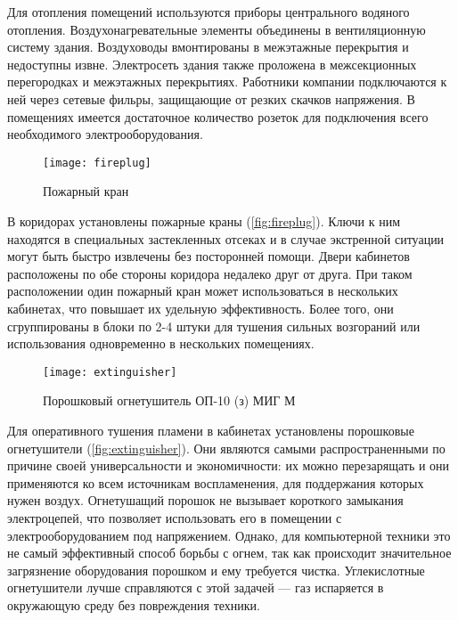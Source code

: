 Для отопления помещений используются приборы центрального водяного отопления. Воздухонагревательные элементы объединены в вентиляционную систему здания. Воздуховоды вмонтированы в межэтажные перекрытия и недоступны извне. Электросеть здания также проложена в межсекционных перегородках и межэтажных перекрытиях. Работники компании подключаются к ней через сетевые фильры, защищающие от резких скачков напряжения. В помещениях имеется достаточное количество розеток для подключения всего необходимого электрооборудования.

\begin{figure}
  \begin{center}
    \texttt{[image: fireplug]}
    \caption{Пожарный кран}
    \label{fig:fireplug}
  \end{center}
\end{figure}

В коридорах установлены пожарные краны (\autoref{fig:fireplug}). Ключи к ним находятся в специальных застекленных отсеках и в случае экстренной ситуации могут быть быстро извлечены без посторонней помощи. Двери кабинетов расположены по обе стороны коридора недалеко друг от друга. При таком расположении один пожарный кран может использоваться в нескольких кабинетах, что повышает их удельную эффективность. Более того, они сгруппированы в блоки по 2-4 штуки для тушения сильных возгораний или использования одновременно в нескольких помещениях.

\begin{figure}
  \begin{center}
    \texttt{[image: extinguisher]}
    \caption{Порошковый огнетушитель \mbox{ОП-10} (з) МИГ М}
    \label{fig:extinguisher}
  \end{center}
\end{figure}

Для оперативного тушения пламени в кабинетах установлены порошковые огнетушители (\autoref{fig:extinguisher}). Они являются самыми распространенными по причине своей универсальности и экономичности: их можно перезарящать и они применяются ко всем источникам воспламенения, для поддержания которых нужен воздух. Огнетушащий порошок не вызывает короткого замыкания электроцепей, что позволяет использовать его в помещении с электрооборудованием под напряжением. Однако, для компьютерной техники это не самый эффективный способ борьбы с огнем, так как происходит значительное загрязнение оборудования порошком и ему требуется чистка. Углекислотные огнетушители лучше справляются с этой задачей --- газ испаряется в окружающую среду без повреждения техники.

